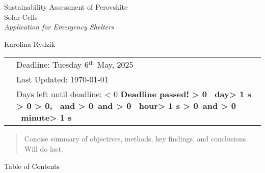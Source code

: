 \documentclass{article}
\newcounter{deadlineyear}\setcounter{deadlineyear}{2025}
\newcounter{deadlinemonth}\setcounter{deadlinemonth}{5} %
\newcounter{deadlineday}\setcounter{deadlineday}{6}
\newcounter{deadlinetime}\setcounter{deadlinetime}{0} %
\newcounter{mydatenumber}
\newcounter{currentdate}
\newcounter{daysdiff}
\newcounter{currenttime}
\newcounter{totalminutes}
\newcounter{displaydays}
\newcounter{remainingmins}
\newcounter{displayhours}
\newcounter{displaymins}
\newcommand{\timeUntilDeadline}{%
	\setmydatenumber{mydatenumber}{\thedeadlineyear}{\thedeadlinemonth}{\thedeadlineday}%
	\setmydatenumber{currentdate}{\the\year}{\the\month}{\the\day}%
	\setcounter{daysdiff}{\themydatenumber - \thecurrentdate}%
	\setcounter{currenttime}{\time}%
	\setcounter{totalminutes}{\thedaysdiff * 1440 + \thedeadlinetime - \thecurrenttime}%
	\ifnum\thetotalminutes < 0
	\textbf{\color{red}Deadline passed!}%
	\else
	\setcounter{displaydays}{\thetotalminutes / 1440}%
	\setcounter{remainingmins}{\thetotalminutes - \thedisplaydays * 1440}%
	\setcounter{displayhours}{\theremainingmins / 60}%
	\setcounter{displaymins}{\theremainingmins - \thedisplayhours * 60}%
	\textbf{%
		\ifnum\thedisplaydays > 0
		\thedisplaydays\ day\ifnum\thedisplaydays > 1 s\fi%
		\ifnum\thedisplayhours > 0
		\ifnum\thedisplaymins > 0, \else\ and \fi%
		\else
		\ifnum\thedisplaymins > 0\ and \fi%
		\fi%
		\fi%
		\ifnum\thedisplayhours > 0
		\thedisplayhours\ hour\ifnum\thedisplayhours > 1 s\fi%
		\ifnum\thedisplaymins > 0\ and \fi%
		\fi%
		\ifnum\thedisplaymins > 0
		\thedisplaymins\ minute\ifnum\thedisplaymins > 1 s\fi%
		\fi%
	}%
	\fi
}
\begin{document}
\thispagestyle{empty}
\vspace*{10em}

\Huge \noindent 
Sustainability Assessment of \color{green!50!black}Perovskite\\ Solar Cells \\[1em]
\color{black}
\normalsize \textit{Application for Emergency Shelters}\\
\vspace*{4em}

\noindent \large Karolina Rydzik

\vspace*{\fill}

\normalsize
\hspace*{-2.9em}
\begin{tabular}{@{}l l@{}}
	& Deadline: Tuesday 6$^{\text{th}}$ May, 2025\\
	& Last Updated: \today\, \currenttime \\
	& Days left until deadline: \timeUntilDeadline \\
\end{tabular}

	\newpage\thispagestyle{empty}
	
	\begin{abstract} 
		Concise summary of objectives, methods, key findings, and conclusions. Will do last.
	\end{abstract}
	
	\newpage{}
	
	\noindent
	
	\huge Table of Contents\\
	
	\normalsize
	
	{
		\hypersetup{linkcolor=black}
		\tableofcontents
	}    


	\thispagestyle{empty}

	{
		\hypersetup{linkcolor=black}
		\tableofcontents
	}    
	
	
	\newpage{}
	\noindent{}\setcounter{page}{1}
\end{document}
